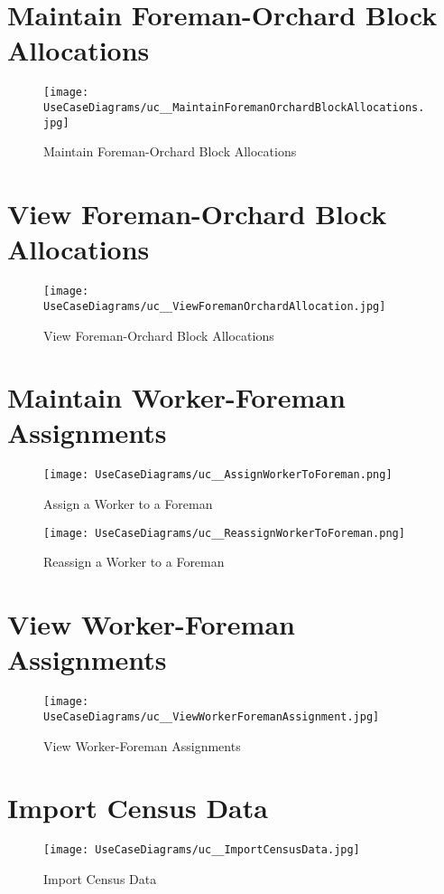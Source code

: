 \documentclass[11pt,fleqn]{book} %
\begin{document}
	
	\section{Maintain Foreman-Orchard Block Allocations}
	\begin{figure}
		\texttt{[image: UseCaseDiagrams/uc\_\_MaintainForemanOrchardBlockAllocations.jpg]}
		\caption{Maintain Foreman-Orchard Block Allocations}
	\end{figure}
	
	\section{View Foreman-Orchard Block Allocations}
	\begin{figure}
		\texttt{[image: UseCaseDiagrams/uc\_\_ViewForemanOrchardAllocation.jpg]}
		\caption{View Foreman-Orchard Block Allocations}
	\end{figure}
	
	\section{Maintain Worker-Foreman Assignments}
	\begin{figure}
		\texttt{[image: UseCaseDiagrams/uc\_\_AssignWorkerToForeman.png]}
		\caption{Assign a Worker to a Foreman}
	\end{figure}
	\begin{figure}
		\texttt{[image: UseCaseDiagrams/uc\_\_ReassignWorkerToForeman.png]}
		\caption{Reassign a Worker to a Foreman}
	\end{figure}
	
	\section{View Worker-Foreman Assignments}
	\begin{figure}
		\texttt{[image: UseCaseDiagrams/uc\_\_ViewWorkerForemanAssignment.jpg]}
		\caption{View Worker-Foreman Assignments}
	\end{figure}
	
	\section{Import Census Data}
	\begin{figure}
		\texttt{[image: UseCaseDiagrams/uc\_\_ImportCensusData.jpg]}
		\caption{Import Census Data}
	\end{figure}
	
\end{document}
